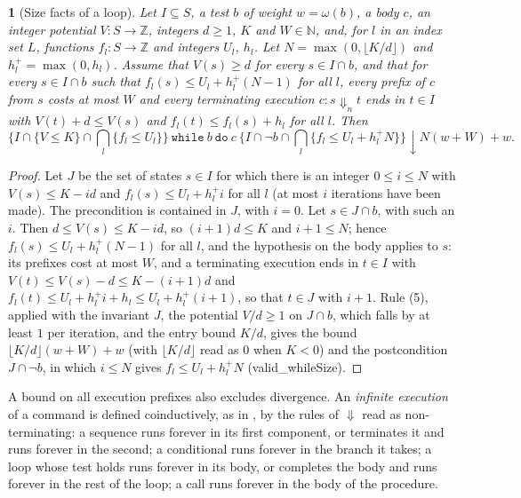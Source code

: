 \documentclass[oneside,english]{amsart}
\numberwithin{equation}{section}
\numberwithin{figure}{section}
\theoremstyle{plain}
\theoremstyle{definition}
\theoremstyle{plain}
\newtheorem{prop}[thm]{\protect\propositionname}
\theoremstyle{remark}
\theoremstyle{plain}
\theoremstyle{definition}
\theoremstyle{plain}
\theoremstyle{remark}
\newcommand{\lean}[1]{{\ttfamily\small #1}}
\providecommand{\propositionname}{Proposition}
\begin{document}
\begin{prop}[Size facts of a loop]
\label{prop:size-facts}
Let $I \subseteq S$, a test $b$ of weight $w = \omega(b)$, a body $c$, an integer potential $V : S \to \mathbb{Z}$, integers $d \ge 1$, $K$ and $W \in \mathbb{N}$, and, for $l$ in an index set $L$, functions $f_l : S \to \mathbb{Z}$ and integers $U_l$, $h_l$. Let $N = \max(0, \lfloor K/d \rfloor)$ and $h_l^+ = \max(0, h_l)$. Assume that $V(s) \ge d$ for every $s \in I \cap b$, and that for every $s \in I \cap b$ such that $f_l(s) \le U_l + h_l^+ (N - 1)$ for all $l$, every prefix of $c$ from $s$ costs at most $W$ and every terminating execution $c : s \Downarrow_n t$ ends in $t \in I$ with $V(t) + d \le V(s)$ and $f_l(t) \le f_l(s) + h_l$ for all $l$. Then
\[
\{I \cap \{V \le K\} \cap \textstyle\bigcap_l \{f_l \le U_l\}\}\ \mathtt{while}\ b\ \mathtt{do}\ c\ \{I \cap \neg b \cap \textstyle\bigcap_l \{f_l \le U_l + h_l^+ N\}\}\!\downarrow\! N (w + W) + w.
\]
\end{prop}

\begin{proof}
Let $J$ be the set of states $s \in I$ for which there is an integer $0 \le i \le N$ with $V(s) \le K - i d$ and $f_l(s) \le U_l + h_l^+ i$ for all $l$ (at most $i$ iterations have been made). The precondition is contained in $J$, with $i = 0$. Let $s \in J \cap b$, with such an $i$. Then $d \le V(s) \le K - i d$, so $(i + 1) d \le K$ and $i + 1 \le N$; hence $f_l(s) \le U_l + h_l^+ (N - 1)$ for all $l$, and the hypothesis on the body applies to $s$: its prefixes cost at most $W$, and a terminating execution ends in $t \in I$ with $V(t) \le V(s) - d \le K - (i + 1) d$ and $f_l(t) \le U_l + h_l^+ i + h_l \le U_l + h_l^+ (i + 1)$, so that $t \in J$ with $i + 1$. Rule (5), applied with the invariant $J$, the potential $V/d \ge 1$ on $J \cap b$, which falls by at least $1$ per iteration, and the entry bound $K/d$, gives the bound $\lfloor K/d \rfloor (w + W) + w$ (with $\lfloor K/d \rfloor$ read as $0$ when $K < 0$) and the postcondition $J \cap \neg b$, in which $i \le N$ gives $f_l \le U_l + h_l^+ N$ (\lean{valid\_\allowbreak whileSize}).
\end{proof}

A bound on all execution prefixes also excludes divergence. An \emph{infinite execution} of a command is defined coinductively, as in \cite{leroy2009coinductive}, by the rules of $\Downarrow$ read as non-terminating: a sequence runs forever in its first component, or terminates it and runs forever in the second; a conditional runs forever in the branch it takes; a loop whose test holds runs forever in its body, or completes the body and runs forever in the rest of the loop; a call runs forever in the body of the procedure.
\end{document}
